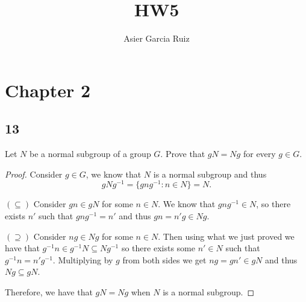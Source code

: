 \documentclass{article}
\title{HW5}
\author{Asier Garcia Ruiz}
\newenvironment{hwproof}[1]
{
    #1
    \begin{proof}
}{
    \end{proof}
}
\begin{document}
\maketitle

\section*{Chapter 2}
\subsection*{13}
\begin{hwproof}
    {
        Let $N$ be a normal subgroup of a group $G$. Prove that $gN = Ng$ for every
        $g \in G$.
    }

    Consider $g \in G$, we know that $N$ is a normal subgroup and thus
    \begin{equation*}
        gNg^{-1} = \{gng^{-1}: n \in N\} = N.
    \end{equation*}

    $(\subseteq)$ Consider $gn \in gN$ for some $n \in N$. We know that
    $gng^{-1} \in N$, so there exists $n'$ such that $gng^{-1} = n'$ and thus
    $gn = n'g \in Ng$.

    $(\supseteq)$ Consider $ng \in Ng$ for some $n \in N$. Then using what we
    just proved we have that $g^{-1}n \in g^{-1}N \subseteq Ng^{-1}$ so there exists
    some $n' \in N$ such that $g^{-1}n = n'g^{-1}$. Multiplying by $g$ from both
    sides we get $ng = gn' \in gN$ and thus $Ng \subseteq gN$.

    Therefore, we have that $gN = Ng$ when $N$ is a normal subgroup.
\end{hwproof}
\end{document}
